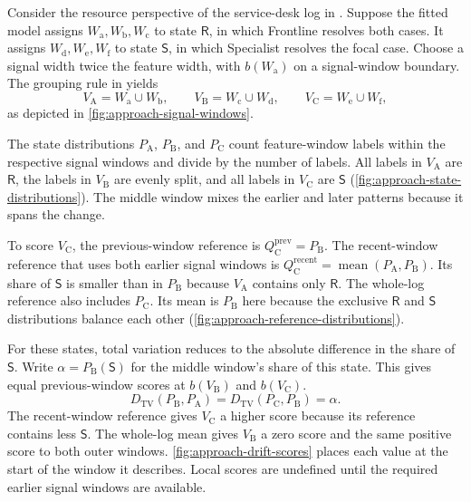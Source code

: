\begin{Example}
\label{ex:drift-score}
Consider the resource perspective of the service-desk log in . Suppose the fitted model assigns $W_{\mathrm a},W_{\mathrm b},W_{\mathrm c}$ to state $\mathsf R$, in which Frontline resolves both cases. It assigns $W_{\mathrm d},W_{\mathrm e},W_{\mathrm f}$ to state $\mathsf S$, in which Specialist resolves the focal case. Choose a signal width twice the feature width, with $b(W_{\mathrm a})$ on a signal-window boundary. The grouping rule in  yields
\[
  V_{\mathrm A}=W_{\mathrm a}\cup W_{\mathrm b},\qquad
  V_{\mathrm B}=W_{\mathrm c}\cup W_{\mathrm d},\qquad
  V_{\mathrm C}=W_{\mathrm e}\cup W_{\mathrm f},
\]
as depicted in \autoref{fig:approach-signal-windows}.

The state distributions $P_{\mathrm A}$, $P_{\mathrm B}$, and $P_{\mathrm C}$ count feature-window labels within the respective signal windows and divide by the number of labels. All labels in $V_{\mathrm A}$ are $\mathsf R$, the labels in $V_{\mathrm B}$ are evenly split, and all labels in $V_{\mathrm C}$ are $\mathsf S$ (\autoref{fig:approach-state-distributions}). The middle window mixes the earlier and later patterns because it spans the change.

To score $V_{\mathrm C}$, the previous-window reference is $Q_{\mathrm C}^{\mathrm{prev}}=P_{\mathrm B}$. The recent-window reference that uses both earlier signal windows is $Q_{\mathrm C}^{\mathrm{recent}}=\operatorname{mean}(P_{\mathrm A},P_{\mathrm B})$. Its share of $\mathsf S$ is smaller than in $P_{\mathrm B}$ because $V_{\mathrm A}$ contains only $\mathsf R$. The whole-log reference also includes $P_{\mathrm C}$. Its mean is $P_{\mathrm B}$ here because the exclusive $\mathsf R$ and $\mathsf S$ distributions balance each other (\autoref{fig:approach-reference-distributions}).

For these states, total variation reduces to the absolute difference in the share of $\mathsf S$. Write $\alpha=P_{\mathrm B}(\mathsf S)$ for the middle window's share of this state. This gives equal previous-window scores at $b(V_{\mathrm B})$ and $b(V_{\mathrm C})$.
\[
  D_{\mathrm{TV}}(P_{\mathrm B},P_{\mathrm A})
  =D_{\mathrm{TV}}(P_{\mathrm C},P_{\mathrm B})
  =\alpha.
\]
The recent-window reference gives $V_{\mathrm C}$ a higher score because its reference contains less $\mathsf S$. The whole-log mean gives $V_{\mathrm B}$ a zero score and the same positive score to both outer windows. \autoref{fig:approach-drift-scores} places each value at the start of the window it describes. Local scores are undefined until the required earlier signal windows are available.
\end{Example}

